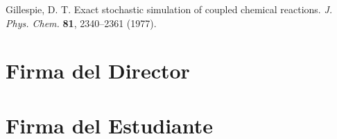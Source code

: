 \documentclass[12pt]{article}
\begin{document}
\begin{thebibliography}{10}
 Gillespie, D. T. Exact stochastic simulation of coupled chemical reactions. \textit{J. Phys. Chem.} \textbf{81}, 2340--2361 (1977).






\end{thebibliography}

\section*{Firma del Director}
\vspace{1.0cm}

\section*{Firma del Estudiante}
\end{document}

